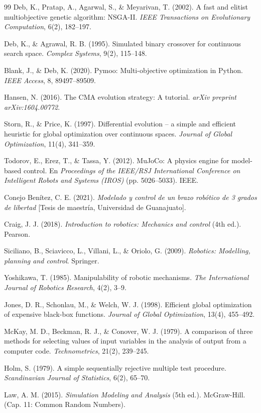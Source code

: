 \documentclass[11pt,a4paper]{article}
\begin{document}
\begin{thebibliography}{99}
Deb, K., Pratap, A., Agarwal, S., \& Meyarivan, T. (2002). A fast and elitist multiobjective genetic algorithm: NSGA-II. \textit{IEEE Transactions on Evolutionary Computation}, 6(2), 182--197.

Deb, K., \& Agrawal, R. B. (1995). Simulated binary crossover for continuous search space. \textit{Complex Systems}, 9(2), 115--148.

Blank, J., \& Deb, K. (2020). Pymoo: Multi-objective optimization in Python. \textit{IEEE Access}, 8, 89497--89509.

Hansen, N. (2016). The CMA evolution strategy: A tutorial. \textit{arXiv preprint arXiv:1604.00772}.

Storn, R., \& Price, K. (1997). Differential evolution -- a simple and efficient heuristic for global optimization over continuous spaces. \textit{Journal of Global Optimization}, 11(4), 341--359.

Todorov, E., Erez, T., \& Tassa, Y. (2012). MuJoCo: A physics engine for model-based control. En \textit{Proceedings of the IEEE/RSJ International Conference on Intelligent Robots and Systems (IROS)} (pp. 5026--5033). IEEE.

Conejo Benítez, C. E. (2021). \textit{Modelado y control de un brazo robótico de 3 grados de libertad} [Tesis de maestría, Universidad de Guanajuato].

Craig, J. J. (2018). \textit{Introduction to robotics: Mechanics and control} (4th ed.). Pearson.

Siciliano, B., Sciavicco, L., Villani, L., \& Oriolo, G. (2009). \textit{Robotics: Modelling, planning and control}. Springer.

Yoshikawa, T. (1985). Manipulability of robotic mechanisms. \textit{The International Journal of Robotics Research}, 4(2), 3--9.

Jones, D. R., Schonlau, M., \& Welch, W. J. (1998). Efficient global optimization of expensive black-box functions. \emph{Journal of Global Optimization}, 13(4), 455--492.

McKay, M. D., Beckman, R. J., \& Conover, W. J. (1979). A comparison of three methods for selecting values of input variables in the analysis of output from a computer code. \emph{Technometrics}, 21(2), 239--245.

Holm, S. (1979). A simple sequentially rejective multiple test procedure. \emph{Scandinavian Journal of Statistics}, 6(2), 65--70.

Law, A. M. (2015). \emph{Simulation Modeling and Analysis} (5th ed.). McGraw-Hill. (Cap. 11: Common Random Numbers).
\end{thebibliography}
\end{document}
